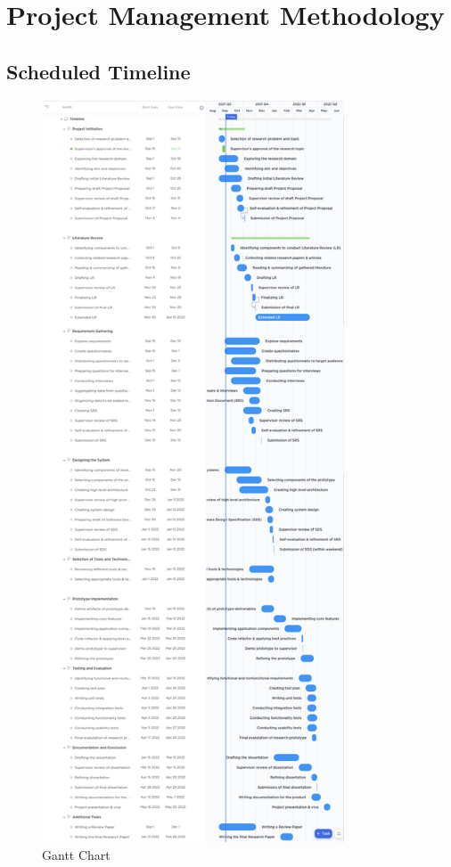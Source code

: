 \documentclass[a4paper, 12pt, oneside]{report}
\begin{document}
\section{Project Management Methodology}
\newpage
\subsection{Scheduled Timeline}
\begin{figure}[h!]
\centering
\includegraphics[width=0.8\textwidth,height=0.9\textheight]{images/gantt-chart.png}
\caption{Gantt Chart}
\end{figure}
\end{document}
